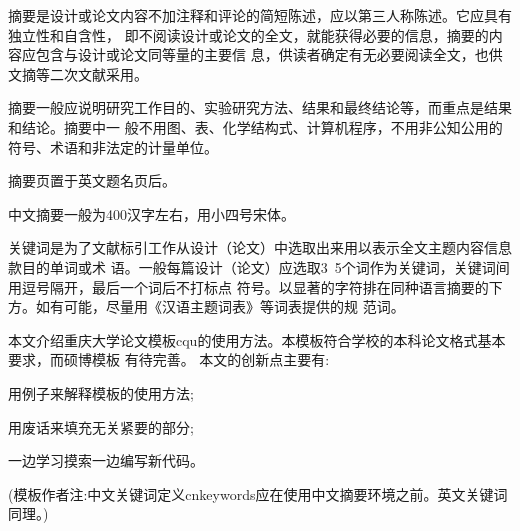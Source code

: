 \documentclass[bachelor,zhspacing]{cqu}  %
\begin{document}
\cnkind{****}
\enkind{****}
\makecntitle 
\makeentitle 

\setcounter{page}{0}
\begin{cnabstract}
摘要是设计或论文内容不加注释和评论的简短陈述，应以第三人称陈述。它应具有独立性和自含性，
即不阅读设计或论文的全文，就能获得必要的信息，摘要的内容应包含与设计或论文同等量的主要信
息，供读者确定有无必要阅读全文，也供文摘等二次文献采用。\par
摘要一般应说明研究工作目的、实验研究方法、结果和最终结论等，而重点是结果和结论。摘要中一
般不用图、表、化学结构式、计算机程序，不用非公知公用的符号、术语和非法定的计量单位。\par
摘要页置于英文题名页后。 \par
中文摘要一般为400汉字左右，用小四号宋体。 \par
关键词是为了文献标引工作从设计（论文）中选取出来用以表示全文主题内容信息款目的单词或术
语。一般每篇设计（论文）应选取3~5个词作为关键词，关键词间用逗号隔开，最后一个词后不打标点
符号。以显著的字符排在同种语言摘要的下方。如有可能，尽量用《汉语主题词表》等词表提供的规
范词。\par
本文介绍重庆大学论文模板cqu的使用方法。本模板符合学校的本科论文格式基本要求，而硕博模板
有待完善。
本文的创新点主要有:
\begin{itemize*}
\item 用例子来解释模板的使用方法;
\item 用废话来填充无关紧要的部分;
\item 一边学习摸索一边编写新代码。
\end{itemize*}
(模板作者注:中文关键词定义cnkeywords应在使用中文摘要环境之前。英文关键词同理。)
\end{cnabstract} 
\end{document}
